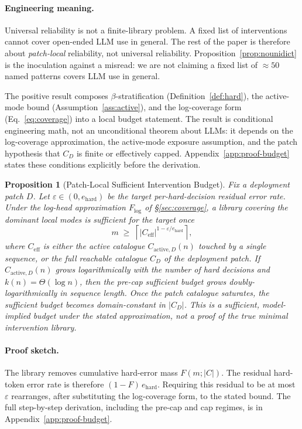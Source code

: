 \documentclass{article}
\theoremstyle{taeplain}
\newtheorem{proposition}{Proposition}
\theoremstyle{taedefn}
\newcommand{\teApprox}{\ensuremath{\approx}}
\begin{document}
\paragraph{Engineering meaning.}
Universal reliability is not a finite-library problem. A fixed list of interventions cannot cover open-ended LLM use in general. The rest of the paper is therefore about \emph{patch-local} reliability, not universal reliability. Proposition~\ref{prop:nounidict} is the inoculation against a misread: we are not claiming a fixed list of $\teApprox 50$ named patterns covers LLM use in general.

\medskip

The positive result composes $\beta$-stratification (Definition~\ref{def:hard}), the active-mode bound (Assumption~\ref{ass:active}), and the log-coverage form (Eq.~\ref{eq:coverage}) into a local budget statement. The result is conditional engineering math, not an unconditional theorem about LLMs: it depends on the log-coverage approximation, the active-mode exposure assumption, and the patch hypothesis that $C_D$ is finite or effectively capped. Appendix~\ref{app:proof-budget} states these conditions explicitly before the derivation.

\begin{proposition}[Patch-Local Sufficient Intervention Budget]\label{prop:budget}
Fix a deployment patch $D$. Let $\varepsilon \in (0, e_{\text{hard}})$ be the target per-hard-decision residual error rate. Under the log-head approximation $F_{\log}$ of \S\ref{sec:coverage}, a library covering the dominant local modes is sufficient for the target once
\begin{equation}\label{eq:budget}
m \;\geq\; \left\lceil |C_{\text{eff}}|^{1 - \varepsilon / e_{\text{hard}}} \right\rceil,
\end{equation}
where $C_{\text{eff}}$ is either the active catalogue $C_{\text{active},D}(n)$ touched by a single sequence, or the full reachable catalogue $C_D$ of the deployment patch. If $C_{\text{active},D}(n)$ grows logarithmically with the number of hard decisions and $k(n) = \Theta(\log n)$, then the pre-cap sufficient budget grows doubly-logarithmically in sequence length. Once the patch catalogue saturates, the sufficient budget becomes domain-constant in $|C_D|$. This is a sufficient, model-implied budget under the stated approximation, not a proof of the true minimal intervention library.
\end{proposition}

\paragraph{Proof sketch.}
The library removes cumulative hard-error mass $F(m; |C|)$. The residual hard-token error rate is therefore $(1 - F)\,e_{\text{hard}}$. Requiring this residual to be at most $\varepsilon$ rearranges, after substituting the log-coverage form, to the stated bound. The full step-by-step derivation, including the pre-cap and cap regimes, is in Appendix~\ref{app:proof-budget}.
\end{document}

